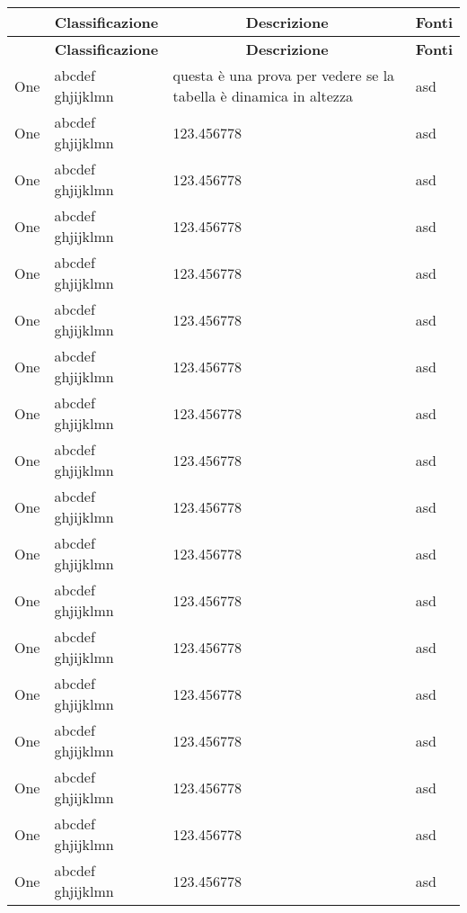 \begingroup
\renewcommand\arraystretch{1.5}
\begin{longtable}{lXp{5cm}X}
	\rowcolorhead 
	\multicolumn{1}{c}{\colorhead \textbf{Codice}} & \multicolumn{1}{c}{ \textbf{Classificazione}} & \multicolumn{1}{c}{ \textbf{Descrizione}}  & \multicolumn{1}{c}{ \textbf{Fonti}} \\
	\endfirsthead
	\rowcolorhead 
	\multicolumn{1}{c}{\colorhead \textbf{Requisito}} & \multicolumn{1}{c}{ \textbf{Classificazione}} & \multicolumn{1}{c}{ \textbf{Descrizione}}  & \multicolumn{1}{c}{ \textbf{Fonti}} \\
	\endhead
	\endfoot
	\endlastfoot
	
	\rowcolorlight One & abcdef ghjijklmn & questa è una prova per vedere se la tabella è dinamica in altezza & asd \\
	\rowcolordark One & abcdef ghjijklmn & 123.456778 & asd \\
	\rowcolorlight One & abcdef ghjijklmn & 123.456778 & asd \\
	\rowcolordark One & abcdef ghjijklmn & 123.456778 & asd \\
	\rowcolorlight One & abcdef ghjijklmn & 123.456778 & asd \\
	\rowcolordark One & abcdef ghjijklmn & 123.456778 & asd \\
	\rowcolorlight One & abcdef ghjijklmn & 123.456778 & asd \\
	\rowcolordark One & abcdef ghjijklmn & 123.456778 & asd \\
	\rowcolorlight One & abcdef ghjijklmn & 123.456778 & asd \\
	\rowcolordark One & abcdef ghjijklmn & 123.456778 & asd \\
	\rowcolorlight One & abcdef ghjijklmn & 123.456778 & asd \\
	\rowcolordark One & abcdef ghjijklmn & 123.456778 & asd \\
	\rowcolorlight One & abcdef ghjijklmn & 123.456778 & asd \\
	\rowcolordark One & abcdef ghjijklmn & 123.456778 & asd \\
	\rowcolorlight One & abcdef ghjijklmn & 123.456778 & asd \\
	\rowcolordark One & abcdef ghjijklmn & 123.456778 & asd \\
	\rowcolorlight One & abcdef ghjijklmn & 123.456778 & asd \\
	\rowcolordark One & abcdef ghjijklmn & 123.456778 & asd \\

\end{longtable}
